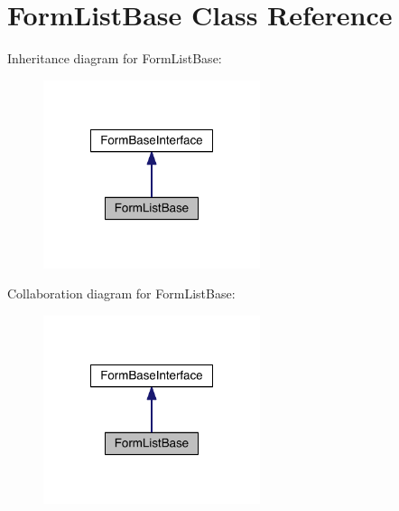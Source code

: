 \hypertarget{classapp_1_1models_1_1core_1_1_form_1_1_form_list_base}{\section{Form\-List\-Base Class Reference}
\label{classapp_1_1models_1_1core_1_1_form_1_1_form_list_base}
}


Inheritance diagram for Form\-List\-Base\-:
\nopagebreak
\begin{figure}[H]
\begin{center}
\leavevmode
\includegraphics[width=180pt]{classapp_1_1models_1_1core_1_1_form_1_1_form_list_base__inherit__graph}
\end{center}
\end{figure}


Collaboration diagram for Form\-List\-Base\-:
\nopagebreak
\begin{figure}[H]
\begin{center}
\leavevmode
\includegraphics[width=180pt]{classapp_1_1models_1_1core_1_1_form_1_1_form_list_base__coll__graph}
\end{center}
\end{figure}
